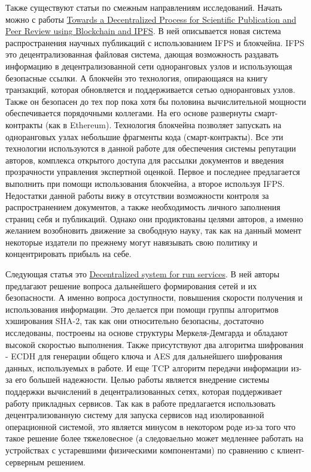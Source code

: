 Также существуют статьи по смежным направлениям исследований. Начать
можно с работы
\href{http://128.171.57.22/bitstream/10125/59901/0461.pdf}{Towards a
Decentralized Process for Scientific Publication and Peer Review using
Blockchain and IPFS}. В ней описывается новая система распространения
научных публикаций с использованием IFPS и блокчейна. IFPS это
децентрализованная файловая система, дающая возможность раздавать
информацию в децентрализованной сети одноранговых узлов и использующая
безопасные ссылки. А блокчейн это технология, опирающаяся на книгу
транзакций, которая обновляется и поддерживается сетью одноранговых
узлов. Также он безопасен до тех пор пока хотя бы половина
вычислительной мощности обеспечивается порядочными коллегами. На его
основе развернуты смарт-контракты (как в Ethereum). Технология блокчейна
позволяет запускать на одноранговых узлах небольшие фрагменты кода
(смарт-контракты). Все эти технологии используются в данной работе для
обеспечения системы репутации авторов, комплекса открытого доступа для
рассылки документов и введения прозрачности управления экспертной
оценкой. Первое и последнее предлагается выполнить при помощи
использования блокчейна, а второе используя IFPS. Недостатки данной
работы вижу в отсутствии возможности контроля за распространением
документов, а также необходимость личного заполнения страниц себя и
публикаций. Однако они продиктованы целями авторов, а именно желанием
возобновить движение за свободную науку, так как на данный момент
некоторые издатели по прежнему могут навязывать свою политику и
концентрировать прибыль на себе.

Следующая статья это
\href{http://ceur-ws.org/Vol-2353/paper68.pdf}{Decentralized system for
run services}. В ней авторы предлагают решение вопроса дальнейшего
формирования сетей и их безопасности. А именно вопроса доступности,
повышения скорости получения и использования информации. Это делается
при помощи группы алгоритмов хэширования SHA-2, так как они относительно
безопасны, достаточно исследованы, построены на основе структуры
Меркеля-Демгарда и обладают высокой скоростью выполнения. Также
присутствуют два алгоритма шифрования - ECDH для генерации общего ключа
и AES для дальнейшего шифрования данных, используемых в работе. И еще
TCP алгоритм передачи информации из-за его большей надежности. Целью
работы является внедрение системы поддержки вычислений в
децентрализованных сетях, которая поддерживает работу прикладных
сервисов. Так как в работе предлагается использовать децентрализованную
систему для запуска сервисов над изолированной операционной системой,
это является минусом в некотором роде из-за того что такое решение более
тяжеловесное (а следоваельно может медленнее работать на устройствах с
устаревшими физическими компонентами) по сравнению с клиент-серверным
решением.

